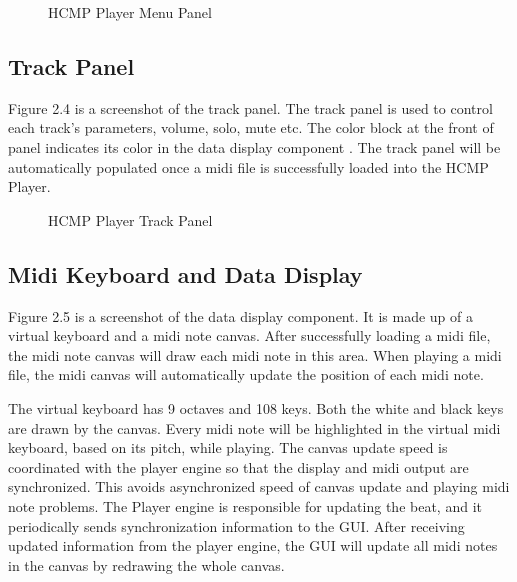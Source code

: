 \begin{figure}[H]
\caption{HCMP Player Menu Panel}
\label{fig:speciation}
\end{figure}

\subsection{Track Panel}

Figure 2.4 is a screenshot of the track panel. The track panel is used to 
control each track's parameters, volume, solo, mute etc. The color
block at the front of panel indicates its color in the data display component . The 
track panel will be automatically populated once a midi file is successfully 
loaded into the HCMP Player.
\begin{figure}[H]
\caption{HCMP Player Track Panel}
\label{fig:speciation}
\end{figure}

\subsection{Midi Keyboard and Data Display}
Figure 2.5 is a screenshot of the data display component. It is made up of a virtual  
keyboard and a midi note canvas. After successfully loading a midi file, the midi 
note canvas will 
draw each midi note in this area. When playing a midi file, the midi canvas will 
automatically update the position of each midi note. 

The virtual keyboard has 9 octaves and 108 keys. Both the white and black keys 
are drawn by the canvas. Every midi note will be highlighted in the 
virtual midi keyboard, based on its pitch, while playing. The canvas update speed is 
coordinated with the player engine so that the display and midi 
output are synchronized. This avoids asynchronized speed 
of canvas update and playing midi note problems. The Player engine is responsible for 
updating the beat, and it 
periodically sends synchronization information to the GUI. After receiving updated 
information from the player engine, the GUI will update all midi notes in the canvas by 
redrawing the whole canvas.

